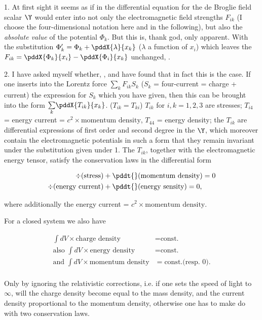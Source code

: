 \documentclass{article}
\newcommand{\uequ}[1]{
\begin{align*}
#1
\end{align*}
}
\newcommand{\sumX}[1]{\underset{#1}{\sum}}
\begin{document}
1. At first sight it seems as if in the differential equation for the de Broglie field scalar $\Y$ would enter into not only the electromagnetic field strengths $F_{ik}$ (I choose the four-dimensional notation here and in the following), but also the \textit{absolute value} of the potential $\Phi_k$. But this is, thank god, only apparent. With the substitution $\Phi'_k = \Phi_k + \pddX{\lambda}{x_k}$ ($\lambda$ a function of $x_i$) which leaves the $F_{ik} = \pddX{\Phi_k}{x_i} - \pddX{\Phi_i}{x_k}$ unchanged, .

2. I have asked myself whether, , and have found that in fact this is the case. If one inserts into the Lorentz force $\sumX{k}F_{ik}S_k$ ($S_k$ = four-current = charge + current) the expression for $S_k$ which you have given, then this can be brought into the form $\sumX{k}\pddX{T_{ik}}{x_k}$. ($T_{ik} = T_{ki}$) $T_{ik}$ for $i,k=1,2,3$ are stresses; $T_{i4}$ = energy current = $c^2\times\text{momentum density}$, $T_{44}$ = energy density; the $T_{ik}$ are differential expressions of first order and second degree in the $\Y$, which moreover contain the electromagnetic potentials in such a form that they remain invariant under the substitution given under 1. The $T_{ik}$, together with the electromagnetic energy tensor, satisfy the conservation laws in the differential form
\uequ{
\div(\text{stress}) &+ \pddt{}(\text{momentum density}) = 0\\
\div(\text{energy current}) &+ \pddt{}(\text{energy sensity}) = 0,
}
where additionally the energy current = $c^2 \times\text{momentum density}$.

For a closed system we also have
\uequ{
\int dV\times\text{charge density} &= \text{const.}\\
\text{also } \int dV\times\text{energy density} &= \text{const.}\\
\text{and } \int dV\times\text{momentum density} &= \text{const.} \text{(resp. 0)}.\\
}

Only by ignoring the relativistic corrections, i.e. if one sets the speed of light to $\infty$, will the charge density become equal to the mass density, and the current density proportional to the momentum density, otherwise one has to make do with two conservation laws.
\end{document}
